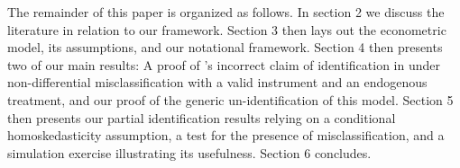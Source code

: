 The remainder of this paper is organized as follows. In section 2 we discuss the literature in relation to our framework. Section 3 then lays out the econometric model, its assumptions, and our notational framework. Section 4 then presents two of our main results: A proof of \citeauthor{Mahajan}'s incorrect claim of identification in under non-differential misclassification with a valid instrument and an endogenous treatment, and our proof of the generic un-identification of this model. Section 5 then presents our partial identification results relying on a conditional homoskedasticity assumption, a test for the presence of misclassification, and a simulation exercise illustrating its usefulness. Section 6 concludes.


 


